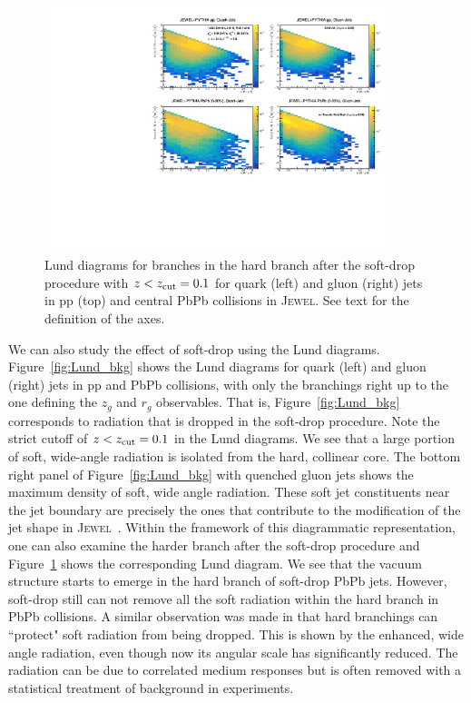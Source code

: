 \documentclass[notoc,preprintnumbers]{JHEP3}
\newcommand{\jw}{\textsc{Jewel}~}
\begin{document}
\begin{figure}[t]
	   \centering
	   \includegraphics[width=0.9\textwidth]{plots/Individual_LundDiagrams_zrel_hardBranch.pdf}
	   \caption{Lund diagrams for branches in the hard branch after the soft-drop procedure with $z<z_{\rm cut}=0.1$ for quark (left) and gluon (right) jets in pp (top) and central PbPb collisions in \textsc{Jewel}. See text for the definition of the axes.}
\label{fig:Lund_hard}
\end{figure}

We can also study the effect of soft-drop using the Lund diagrams. Figure~\ref{fig:Lund_bkg} shows the Lund diagrams for quark (left) and gluon (right) jets in pp and PbPb collisions, with only the branchings right up to the one defining the $z_g$ and $r_g$ observables. That is, Figure~\ref{fig:Lund_bkg} corresponds to radiation that is dropped in the soft-drop procedure. Note the strict cutoff of $z < z_{\rm cut} = 0.1$ in the Lund diagrams. We see that a large portion of soft, wide-angle radiation is isolated from the hard, collinear core. The bottom right panel of Figure~\ref{fig:Lund_bkg} with quenched gluon jets shows the maximum density of soft, wide angle radiation. These soft jet constituents near the jet boundary are precisely the ones that contribute to the modification of the jet shape in \jw \cite{KunnawalkamElayavalli:2017hxo}. Within the framework of this diagrammatic representation, one can also examine the harder branch after the soft-drop procedure and Figure~\ref{fig:Lund_hard} shows the corresponding Lund diagram. We see that the vacuum structure starts to emerge in the hard branch of soft-drop PbPb jets. However, soft-drop still can not remove all the soft radiation within the hard branch in PbPb collisions. A similar observation was made in \cite{Hoang:2017kmk} that hard branchings can ``protect" soft radiation from being dropped. This is shown by the enhanced, wide angle radiation, even though now its angular scale has significantly reduced. The radiation can be due to correlated medium responses but is often removed with a statistical treatment of background in experiments.
\end{document}
